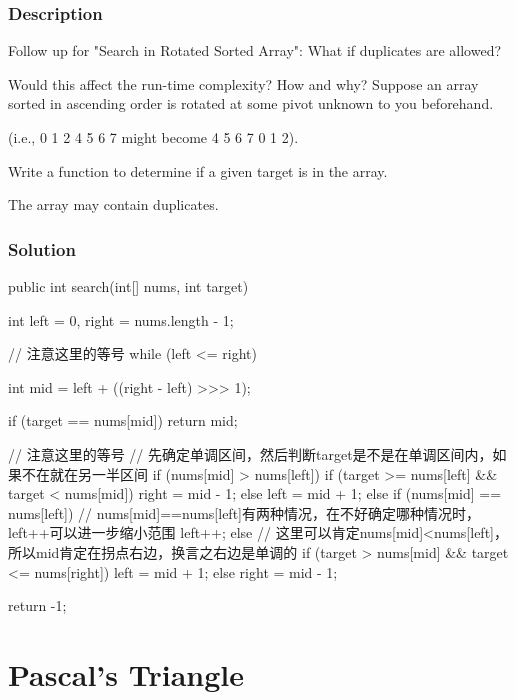 \subsubsection{Description}
Follow up for "Search in Rotated Sorted Array":
What if duplicates are allowed?

Would this affect the run-time complexity? How and why?
Suppose an array sorted in ascending order is rotated at some pivot unknown to you beforehand.

(i.e., 0 1 2 4 5 6 7 might become 4 5 6 7 0 1 2).

Write a function to determine if a given target is in the array.

The array may contain duplicates.

\subsubsection{Solution}

\begin{Code}
public int search(int[] nums, int target) {
    int left = 0, right = nums.length - 1;

    // 注意这里的等号
    while (left <= right) {
        int mid = left + ((right - left) >>> 1);

        if (target == nums[mid]) {
            return mid;
        }

        // 注意这里的等号
        // 先确定单调区间，然后判断target是不是在单调区间内，如果不在就在另一半区间
        if (nums[mid] > nums[left]) {
            if (target >= nums[left] && target < nums[mid]) {
                right = mid - 1;
            } else {
                left = mid + 1;
            }
        } else if (nums[mid] == nums[left]) {
            // nums[mid]==nums[left]有两种情况，在不好确定哪种情况时，left++可以进一步缩小范围
            left++;
        } else {
            // 这里可以肯定nums[mid]<nums[left]，所以mid肯定在拐点右边，换言之右边是单调的
            if (target > nums[mid] && target <= nums[right]) {
                left = mid + 1;
            } else {
                right = mid - 1;
            }
        }
    }

    return -1;
}
\end{Code}

\newpage

\section{Pascal's Triangle} %

